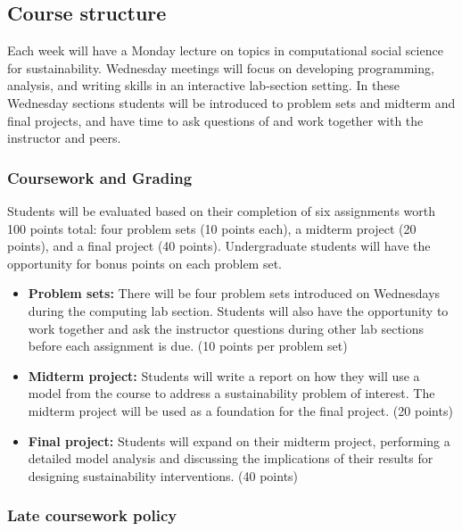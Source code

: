 \documentclass[
]{article}
\providecommand{\tightlist}{%
  \setlength{\itemsep}{0pt}\setlength{\parskip}{0pt}}
\begin{document}
\subsection{Course structure}\label{course-structure}

Each week will have a Monday lecture on topics in computational social
science for sustainability. Wednesday meetings will focus on developing
programming, analysis, and writing skills in an interactive lab-section
setting. In these Wednesday sections students will be introduced to
problem sets and midterm and final projects, and have time to ask
questions of and work together with the instructor and peers.

\subsubsection{Coursework and Grading}\label{coursework-and-grading}

Students will be evaluated based on their completion of six assignments
worth 100 points total: four problem sets (10 points each), a midterm
project (20 points), and a final project (40 points). Undergraduate
students will have the opportunity for bonus points on each problem set.

\begin{itemize}
\tightlist
\item
  \textbf{Problem sets:} There will be four problem sets introduced on
  Wednesdays during the computing lab section. Students will also have
  the opportunity to work together and ask the instructor questions
  during other lab sections before each assignment is due. (10 points
  per problem set)
\item
  \textbf{Midterm project:} Students will write a report on how they
  will use a model from the course to address a sustainability problem
  of interest. The midterm project will be used as a foundation for the
  final project. (20 points)
\item
  \textbf{Final project:} Students will expand on their midterm project,
  performing a detailed model analysis and discussing the implications
  of their results for designing sustainability interventions. (40
  points)
\end{itemize}

\subsubsection{Late coursework policy}\label{late-coursework-policy}
\end{document}
